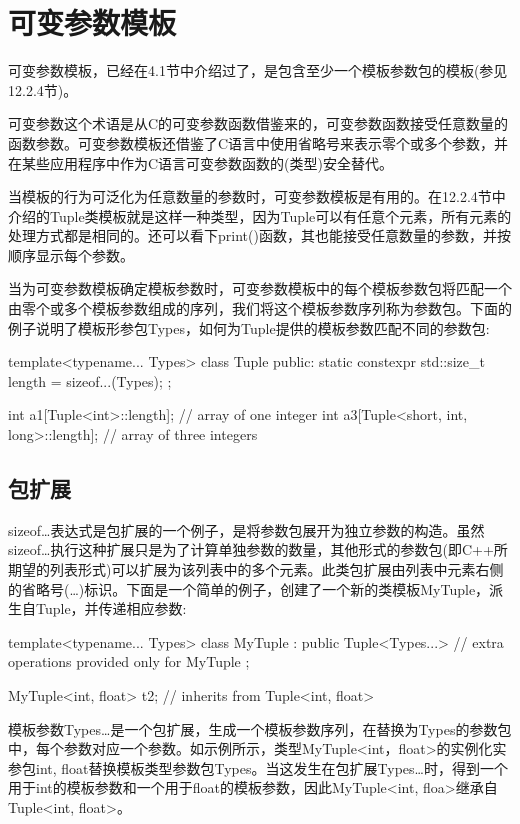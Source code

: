 \section{可变参数模板}

可变参数模板，已经在4.1节中介绍过了，是包含至少一个模板参数包的模板(参见12.2.4节)。

\begin{notice}
可变参数这个术语是从C的可变参数函数借鉴来的，可变参数函数接受任意数量的函数参数。可变参数模板还借鉴了C语言中使用省略号来表示零个或多个参数，并在某些应用程序中作为C语言可变参数函数的(类型)安全替代。
\end{notice}

当模板的行为可泛化为任意数量的参数时，可变参数模板是有用的。在12.2.4节中介绍的Tuple类模板就是这样一种类型，因为Tuple可以有任意个元素，所有元素的处理方式都是相同的。还可以看下print()函数，其也能接受任意数量的参数，并按顺序显示每个参数。

当为可变参数模板确定模板参数时，可变参数模板中的每个模板参数包将匹配一个由零个或多个模板参数组成的序列，我们将这个模板参数序列称为参数包。下面的例子说明了模板形参包Types，如何为Tuple提供的模板参数匹配不同的参数包:

\begin{cpp}
template<typename... Types>
class Tuple {
	public:
	static constexpr std::size_t length = sizeof...(Types);
};

int a1[Tuple<int>::length]; // array of one integer
int a3[Tuple<short, int, long>::length]; // array of three integers
\end{cpp}

\subsection{包扩展}

sizeof…表达式是包扩展的一个例子，是将参数包展开为独立参数的构造。虽然sizeof…执行这种扩展只是为了计算单独参数的数量，其他形式的参数包(即C++所期望的列表形式)可以扩展为该列表中的多个元素。此类包扩展由列表中元素右侧的省略号(…)标识。下面是一个简单的例子，创建了一个新的类模板MyTuple，派生自Tuple，并传递相应参数:

\begin{cpp}
template<typename... Types>
class MyTuple : public Tuple<Types...> {
	// extra operations provided only for MyTuple
};

MyTuple<int, float> t2; // inherits from Tuple<int, float>
\end{cpp}

模板参数Types…是一个包扩展，生成一个模板参数序列，在替换为Types的参数包中，每个参数对应一个参数。如示例所示，类型MyTuple<int，float>的实例化实参包int, float替换模板类型参数包Types。当这发生在包扩展Types…时，得到一个用于int的模板参数和一个用于float的模板参数，因此MyTuple<int, floa>继承自Tuple<int, float>。

